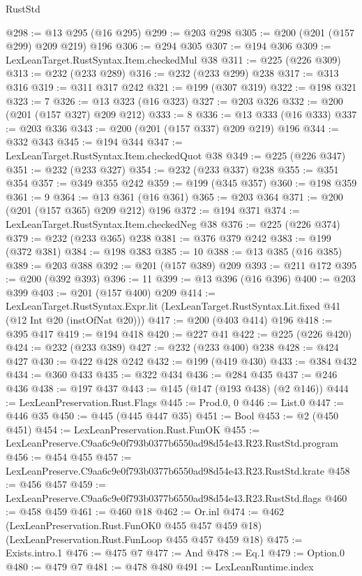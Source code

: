 \begin{lexlean}{RustStd}
\begin{coremodule}
@298 := @13 @295 (@16 @295)
@299 := @203 @298
@305 := @200 (@201 (@157 @299) @209 @219) @196
@306 := @294 @305
@307 := @194 @306
@309 := LexLeanTarget.RustSyntax.Item.checkedMul @38
@311 := @225 (@226 @309)
@313 := @232 (@233 @289)
@316 := @232 (@233 @299) @238
@317 := @313 @316
@319 := @311 @317 @242
@321 := @199 (@307 @319)
@322 := @198 @321
@323 := 7
@326 := @13 @323 (@16 @323)
@327 := @203 @326
@332 := @200 (@201 (@157 @327) @209 @212)
@333 := 8
@336 := @13 @333 (@16 @333)
@337 := @203 @336
@343 := @200 (@201 (@157 @337) @209 @219) @196
@344 := @332 @343
@345 := @194 @344
@347 := LexLeanTarget.RustSyntax.Item.checkedQuot @38
@349 := @225 (@226 @347)
@351 := @232 (@233 @327)
@354 := @232 (@233 @337) @238
@355 := @351 @354
@357 := @349 @355 @242
@359 := @199 (@345 @357)
@360 := @198 @359
@361 := 9
@364 := @13 @361 (@16 @361)
@365 := @203 @364
@371 := @200 (@201 (@157 @365) @209 @212) @196
@372 := @194 @371
@374 := LexLeanTarget.RustSyntax.Item.checkedNeg @38
@376 := @225 (@226 @374)
@379 := @232 (@233 @365) @238
@381 := @376 @379 @242
@383 := @199 (@372 @381)
@384 := @198 @383
@385 := 10
@388 := @13 @385 (@16 @385)
@389 := @203 @388
@392 := @201 (@157 @389) @209
@393 := @211 @172
@395 := @200 (@392 @393)
@396 := 11
@399 := @13 @396 (@16 @396)
@400 := @203 @399
@403 := @201 (@157 @400) @209
@414 := LexLeanTarget.RustSyntax.Expr.lit
    (LexLeanTarget.RustSyntax.Lit.fixed @41 (@12 Int @20 (instOfNat @20)))
@417 := @200 (@403 @414) @196
@418 := @395 @417
@419 := @194 @418
@420 := @227 @41
@422 := @225 (@226 @420)
@424 := @232 (@233 @389)
@427 := @232 (@233 @400) @238
@428 := @424 @427
@430 := @422 @428 @242
@432 := @199 (@419 @430)
@433 := @384 @432
@434 := @360 @433
@435 := @322 @434
@436 := @284 @435
@437 := @246 @436
@438 := @197 @437
@443 := @145 (@147 (@193 @438) (@2 @146))
@444 := LexLeanPreservation.Rust.Flags
@445 := Prod.{0, 0}
@446 := List.{0}
@447 := @446 @35
@450 := @445 (@445 @447 @35)
@451 := Bool
@453 := @2 (@450 @451)
@454 := LexLeanPreservation.Rust.FunOK
@455 := LexLeanPreserve.C9aa6c9e0f793b0377b6550ad98d54e43.R23.RustStd.program
@456 := @454 @455
@457 := LexLeanPreserve.C9aa6c9e0f793b0377b6550ad98d54e43.R23.RustStd.krate
@458 := @456 @457
@459 := LexLeanPreserve.C9aa6c9e0f793b0377b6550ad98d54e43.R23.RustStd.flags
@460 := @458 @459
@461 := @460 @18
@462 := Or.inl
@474 := @462
    (LexLeanPreservation.Rust.FunOK0 @455 @457 @459 @18)
    (LexLeanPreservation.Rust.FunLoop @455 @457 @459 @18)
@475 := Exists.intro.{1}
@476 := @475 @7
@477 := And
@478 := Eq.{1}
@479 := Option.{0}
@480 := @479 @7
@481 := @478 @480
@491 := LexLeanRuntime.index

\end{coremodule}
\end{lexlean}
